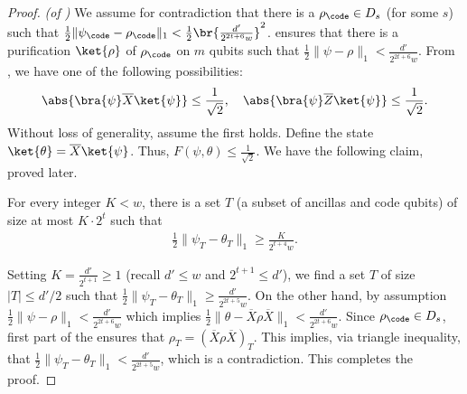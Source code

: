 \documentclass{toc}
\begin{document}
\begin{proof}\textit{(of )}
We assume for contradiction that there is a $\rho_{\code}\in D_{s}$ (for some $s$) such that $\frac{1}{2}\|\psi_{\code}-\rho_{\code}\|_1< \frac{1}{2}\br{\frac{d'}{2^{2t+6}w}}^2$.  ensures that there is a purification $\ket{\rho}$ of $\rho_{\code}$ on $m$ qubits such that $\frac{1}{2}\|\psi-\rho\|_1< \frac{d'}{2^{2t+6}w}$.  From , we have one of the following possibilities:
\begin{align}\abs{\bra{\psi}\overline{X}\ket{\psi}}\leq \frac{1}{\sqrt{2}}, \quad \abs{\bra{\psi}\overline{Z}\ket{\psi}}\leq \frac{1}{\sqrt{2}}.\end{align}
Without loss of generality, assume the first holds.  Define the state $\ket{\theta}=\overline{X}\ket{\psi}$. Thus, $F(\psi, \theta)\leq \frac{1}{\sqrt{2}}$. We have the following claim, proved later.
\begin{claim}
\label{clm:localdistinguishable}
For every integer $K<w$, there is a set $T$ (a subset of ancillas and code qubits) of size at most $K\cdot 2^t$ such that 
\begin{align}\frac{1}{2}\|\psi_{T}- \theta_{T}\|_1 \geq \frac{K}{2^{t+4}w}.\end{align}
\end{claim}
Setting $K=\frac{d'}{2^{t+1}}\geq 1$ (recall $d'\leq w$ and $2^{t+1}\leq d'$), we find a set $T$ of size $|T|\leq d'/2$ such that $\frac{1}{2}\|\psi_{T}- \theta_{T}\|_1 \geq \frac{d'}{2^{2t+5}w}$. On the other hand, by assumption $\frac{1}{2}\|\psi-\rho\|_1< \frac{d'}{2^{2t+6}w}$ which implies $\frac{1}{2}\|\theta-\overline{X}\rho \overline{X}\|_1< \frac{d'}{2^{2t+6}w}$. Since $\rho_{\code} \in D_{s}$, first part of the  ensures that $\rho_{T}=(\overline{X}\rho \overline{X})_{T}$. This implies, via triangle inequality, that $\frac{1}{2}\|\psi_{T}-\theta_{T}\|_1< \frac{d'}{2^{2t+5}w}$, which is a contradiction. This completes the proof.
\end{proof}
\end{document}
